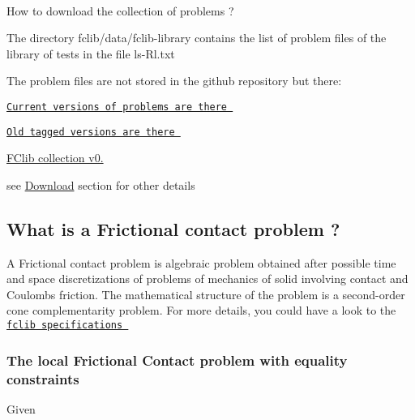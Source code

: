 ~\newline


How to download the collection of problems ? 
\begin{DoxyItemize}
\item The directory fclib/data/fclib-\/library contains the list of problem files of the library of tests in the file ls-\/\+Rl.\+txt 


\item The problem files are not stored in the github repository but there\+:  
\begin{DoxyItemize}
\item \href{http://faf.gforge.inria.fr/fclib-library/}{\tt Current versions of problems are there }  
\item \href{http://fclib.gforge.inria.fr/resources/}{\tt Old tagged versions are there } 
\end{DoxyItemize}
\item \hyperlink{problems_0_2}{F\+Clib collection v0.}  
\end{DoxyItemize}see \hyperlink{download}{Download} section for other details ~\newline
\hypertarget{index_Wahtis}{}\subsection{What is a Frictional contact problem ?}\label{index_Wahtis}
A Frictional contact problem is algebraic problem obtained after possible time and space discretizations of problems of mechanics of solid involving contact and Coulomb\textquotesingle{}s friction. The mathematical structure of the problem is a second-\/order cone complementarity problem. For more details, you could have a look to the \href{doc/FCLib.pdf}{\tt fclib specifications }\hypertarget{index_Localfclib}{}\subsubsection{The local Frictional Contact problem with equality constraints}\label{index_Localfclib}
Given 
